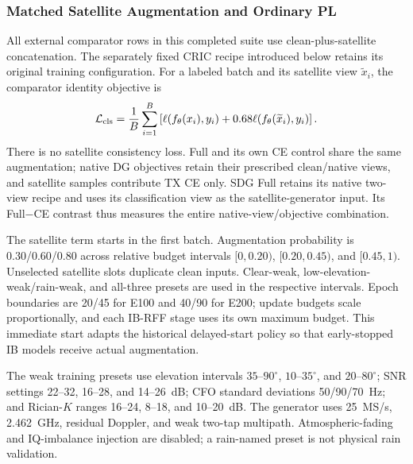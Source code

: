 \subsubsection{Matched Satellite Augmentation and Ordinary PL}
All external comparator rows in this completed suite use clean-plus-satellite concatenation. The separately fixed CRIC recipe introduced below retains its original training configuration. For a labeled batch and its satellite view $\widetilde x_i$, the comparator identity objective is
\begin{equation}
\mathcal L_{\rm cls}=\frac1B\sum_{i=1}^{B}\left[\ell(f_\theta(x_i),y_i)+0.68\ell(f_\theta(\widetilde x_i),y_i)\right].
\label{eq:concat}
\end{equation}
There is no satellite consistency loss. Full and its own CE control share the same augmentation; native DG objectives retain their prescribed clean/native views, and satellite samples contribute TX CE only. SDG Full retains its native two-view recipe and uses its classification view as the satellite-generator input. Its Full$-$CE contrast thus measures the entire native-view/objective combination.

The satellite term starts in the first batch. Augmentation probability is 0.30/0.60/0.80 across relative budget intervals $[0,0.20)$, $[0.20,0.45)$, and $[0.45,1)$. Unselected satellite slots duplicate clean inputs. Clear-weak, low-elevation-weak/rain-weak, and all-three presets are used in the respective intervals. Epoch boundaries are 20/45 for E100 and 40/90 for E200; update budgets scale proportionally, and each IB-RFF stage uses its own maximum budget. This immediate start adapts the historical delayed-start policy so that early-stopped IB models receive actual augmentation.

The weak training presets use elevation intervals $35$--$90^\circ$, $10$--$35^\circ$, and $20$--$80^\circ$; SNR settings 22--32, 16--28, and 14--26~dB; CFO standard deviations 50/90/70~Hz; and Rician-$K$ ranges 16--24, 8--18, and 10--20~dB. The generator uses 25~MS/s, 2.462~GHz, residual Doppler, and weak two-tap multipath. Atmospheric-fading and IQ-imbalance injection are disabled; a rain-named preset is not physical rain validation.

